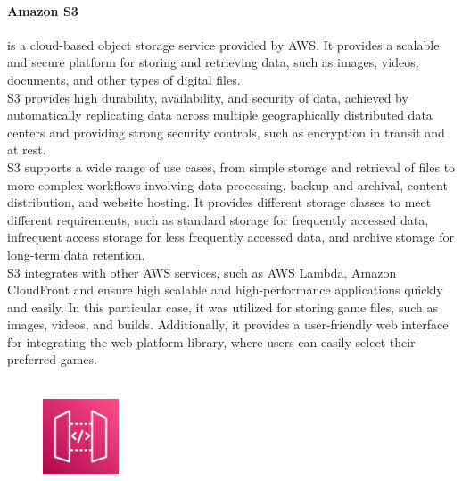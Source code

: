 \documentclass[a4paper,12pt]{report}
\begin{document}
\paragraph{Amazon S3}  is a cloud-based object storage service provided by AWS. It provides a scalable and secure platform for storing and retrieving data, such as images, videos, documents, and other types of digital files.\\
S3 provides high durability, availability, and security of data, achieved by automatically replicating data across multiple geographically distributed data centers and providing strong security controls, such as encryption in transit and at rest.\\
S3 supports a wide range of use cases, from simple storage and retrieval of files to more complex workflows involving data processing, backup and archival, content distribution, and website hosting. It provides different storage classes to meet different requirements, such as standard storage for frequently accessed data, infrequent access storage for less frequently accessed data, and archive storage for long-term data retention.\\
S3 integrates with other AWS services, such as AWS Lambda, Amazon CloudFront and ensure high  scalable and high-performance applications quickly and easily. In this particular case, it was utilized for storing game files, such as images, videos, and builds. Additionally, it provides a user-friendly web interface for integrating the web platform library, where users can easily select their preferred games.\\\\
%
%
%
\begin{figure}
  \centering
  \includegraphics[width=0.2\textwidth]{img/services/API-Gateway}
\end{figure}
%
\end{document}
